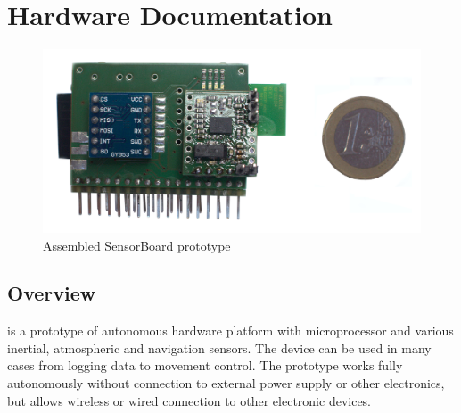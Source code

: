 \chapter{Hardware Documentation}
\label{hardwareDocumentation}

\begin{figure}[H]
	\centering
	\includegraphics[width=16cm]{img/HWassembled.jpg}
	\caption{Assembled SensorBoard prototype}
	\label{HWassembled}
\end{figure}

\section{Overview}
 is a prototype of autonomous hardware platform with microprocessor and various inertial, atmospheric and navigation sensors. The device can be used in many cases from logging data to movement control. The prototype works fully autonomously without connection to external power supply or other electronics, but allows wireless or wired connection to other electronic devices.


